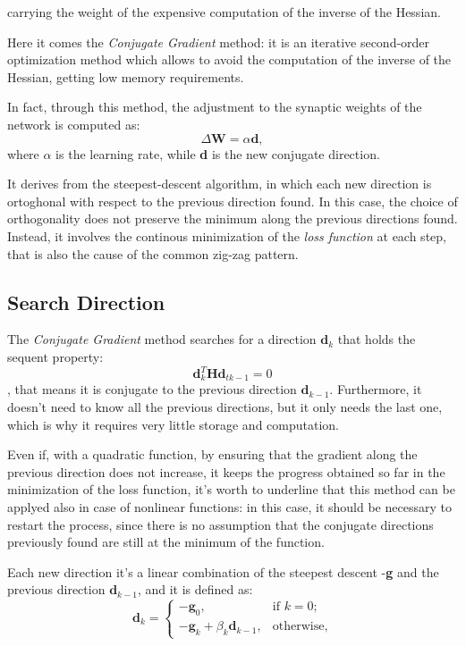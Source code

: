 		 carrying the weight of the expensive computation of the inverse of the Hessian.

		Here it comes the \textit{Conjugate Gradient} method: it is an iterative second-order optimization method which allows to avoid the computation of the inverse of the Hessian, getting low memory requirements.

		In fact, through this method, the adjustment to the synaptic weights of the network is computed as:
		 \begin{equation} 
		 	\label{weight}
		    \Delta\textbf{W} = \alpha\textbf{d},
		 \end{equation} 
		where $\alpha$ is the learning rate, while \textbf{d} is the new conjugate direction.

		It derives from the steepest-descent algorithm, in which each new direction is ortoghonal with respect to the previous direction found.
		In this case, the choice of orthogonality does not preserve the minimum along the previous directions found. Instead, it involves the continous minimization of the \textit{loss function} at each step, that is also the cause of the common zig-zag pattern. 

		\subsection{Search Direction}
		\label{sub:search_direction}
			The \textit{Conjugate Gradient} method searches for a direction $\textbf{d}_k$ that holds the sequent property:
			\begin{equation} 
			\textbf{d}_k^T\textbf{H}\textbf{d}_{tk-1} = 0 
			\end{equation}, that means it is conjugate to the previous direction $\textbf{d}_{k-1}$. Furthermore, it doesn't need to know all the previous directions, but it only needs the last one, which is why it requires very little storage and computation.

			Even if, with a quadratic function, by ensuring that the gradient along the previous direction does not increase, it keeps the progress obtained so far in the minimization of the loss function, it's worth to underline that this method can be applyed also in case of nonlinear functions: in this case, it should be necessary to restart the process, since there is no assumption that the conjugate directions previously found are still at the minimum of the function. 

			Each new direction it's a linear combination of the steepest descent -\textbf{g} and the previous direction $\textbf{d}_{k-1}$, and it is defined as:
			\begin{equation}
			  \textbf{d}_k=\begin{cases}
			    -\textbf{g}_0, & \text{if $k=0$};\\
			    -\textbf{g}_k + \beta_k\textbf{d}_{k-1}, & \text{otherwise,}
			  \end{cases}
			\end{equation}

